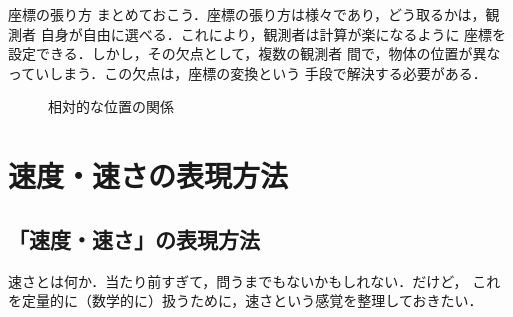 \begin{memo}{座標の張り方}
                まとめておこう．座標の張り方は様々であり，どう取るかは，観測者
                自身が自由に選べる．これにより，観測者は計算が楽になるように
                座標を設定できる．しかし，その欠点として，複数の観測者
                間で，物体の位置が異なっていしまう．この欠点は，座標の変換という
                手段で解決する必要がある．
                    \begin{figure}[hbt]
                        \begin{center}
                            \caption{相対的な位置の関係}
                            \label{fig:SoutaiTekiIchi001}
                        \end{center}
                    \end{figure}
                \end{memo}


    \section{速度・速さの表現方法}\label{subsec:Velocity}
        \subsection{「速度・速さ」の表現方法}
            速さとは何か．当たり前すぎて，問うまでもないかもしれない．だけど，
            これを定量的に（数学的に）扱うために，速さという感覚を整理しておきたい．

